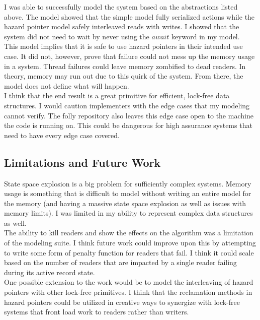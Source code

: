 \documentclass[11pt]{article}
\renewcommand{\_}{\rule{.4em}{.06em}\hspace{.05em}}
\renewcommand{\.}[1]{\ensuremath{\mbox{}#1\mbox{}}}
\begin{document}
\quad \quad I was able to successfully model the system based on the abstractions listed above. The model showed that the simple model fully serialized actions while the hazard pointer model safely interleaved reads with writes. I showed that the system did not need to wait by never using the $await$ keyword in my model. \\

This model implies that it is safe to use hazard pointers in their intended use case. It did not, however, prove that failure could not mess up the memory usage in a system. Thread failures could leave memory zombified to dead readers. In theory, memory may run out due to this quirk of the system. From there, the model does not define what will happen. \\

I think that the end result is a great primitive for efficient, lock-free data structures. I would caution implementers with the edge cases that my modeling cannot verify. The folly repository also leaves this edge case open to the machine the code is running on. This could be dangerous for high assurance systems that need to have every edge case covered.

\subsection{Limitations and Future Work}

\quad \quad State space explosion is a big problem for sufficiently complex systems. Memory usage is something that is difficult to model without writing an entire model for the memory (and having a massive state space explosion as well as issues with memory limits). I was limited in my ability to represent complex data structures as well. \\

The ability to kill readers and show the effects on the algorithm was a limitation of the modeling suite. I think future work could improve upon this by attempting to write some form of penalty function for readers that fail. I think it could scale based on the number of readers that are impacted by a single reader failing during its active record state. \\

One possible extension to the work would be to model the interleaving of hazard pointers with other lock-free primitives. I think that the reclamation methods in hazard pointers could be utilized in creative ways to synergize with lock-free systems that front load work to readers rather than writers.
\end{document}
